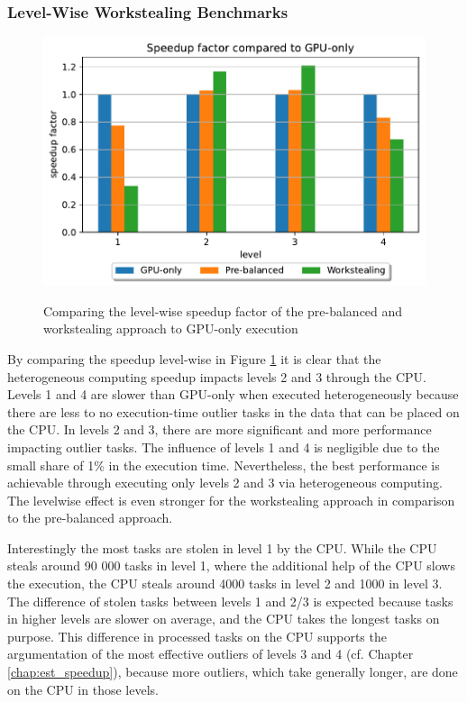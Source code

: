 \subsubsection{Level-Wise Workstealing Benchmarks}
\begin{figure}[H]
  \caption{Comparing the level-wise speedup factor of the pre-balanced and workstealing approach to GPU-only execution}
  \includegraphics[width=\textwidth]{figures/levelwise.pdf}
  \centering
  \label{fig:levelwise_delos}
\end{figure}

By comparing the speedup level-wise in Figure \ref{fig:levelwise_delos} it is clear that the heterogeneous computing speedup impacts levels 2 and 3 through the CPU. Levels 1 and 4 are slower than GPU-only when executed heterogeneously because there are less to no execution-time outlier tasks in the data that can be placed on the CPU. In levels 2 and 3, there are more significant and more performance impacting outlier tasks. The influence of levels 1 and 4 is negligible due to the small share of 1\% in the execution time. Nevertheless, the best performance is achievable through executing only levels 2 and 3 via heterogeneous computing. The levelwise effect is even stronger for the workstealing approach in comparison to the pre-balanced approach.

Interestingly the most tasks are stolen in level 1 by the CPU. While the CPU steals around 90 000 tasks in level 1, where the additional help of the CPU slows the execution, the CPU steals around 4000 tasks in level 2 and 1000 in level 3. The difference of stolen tasks between levels 1 and 2/3 is expected because tasks in higher levels are slower on average, and the CPU takes the longest tasks on purpose. This difference in processed tasks on the CPU supports the argumentation of the most effective outliers of levels 3 and 4 (cf. Chapter \ref{chap:est_speedup}), because more outliers, which take generally longer, are done on the CPU in those levels.


